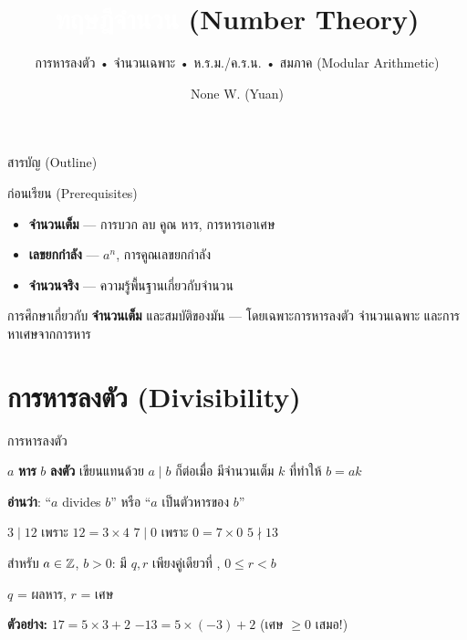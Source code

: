 \documentclass[11pt, aspectratio=169]{beamer}
\title[ทฤษฎีจำนวน]{\textcolor{white}{ทฤษฎีจำนวน} \textcolor{boxBlue!60}{(Number Theory)}}
\subtitle{การหารลงตัว • จำนวนเฉพาะ • ห.ร.ม./ค.ร.น. • สมภาค (Modular Arithmetic) }
\author[None W. (Yuan)]{None W. (Yuan)}
\date{}
\begin{document}
\begin{frame}[plain]\titlepage\end{frame}
\begin{frame}{สารบัญ (Outline)}\tableofcontents\end{frame}

\begin{frame}{ก่อนเรียน (Prerequisites)}
  \begin{explanation}
    \begin{itemize}
      \item \textbf{จำนวนเต็ม} — การบวก ลบ คูณ หาร, การหารเอาเศษ
      \item \textbf{เลขยกกำลัง} — $a^n$, การคูณเลขยกกำลัง
      \item \textbf{จำนวนจริง} — ความรู้พื้นฐานเกี่ยวกับจำนวน
    \end{itemize}
  \end{explanation}

  \begin{intuition}
    การศึกษาเกี่ยวกับ \textbf{จำนวนเต็ม} และสมบัติของมัน —
    โดยเฉพาะการหารลงตัว จำนวนเฉพาะ และการหาเศษจากการหาร
  \end{intuition}
\end{frame}

\section{การหารลงตัว (Divisibility)}

\begin{frame}{การหารลงตัว}
  \begin{explanation}[นิยาม]
    $a$ \textbf{หาร} $b$ \textbf{ลงตัว} เขียนแทนด้วย $a \mid b$
    ก็ต่อเมื่อ มีจำนวนเต็ม $k$ ที่ทำให้ $b = ak$

    \textbf{อ่านว่า}: ``$a$ divides $b$'' หรือ ``$a$ เป็นตัวหารของ $b$''
  \end{explanation}

  \begin{exambox}[ตัวอย่าง]
    $3 \mid 12$ เพราะ $12 = 3 \times 4$ \qquad $7 \mid 0$ เพราะ $0 = 7 \times 0$ \qquad $5 \nmid 13$
  \end{exambox}

  \begin{explanation}
    สำหรับ $a \in \mathbb{Z}$, $b > 0$: มี $q, r$ เพียงคู่เดียวที่ , $0 \leq r < b$

    $q$ = ผลหาร, $r$ = เศษ

    \textbf{ตัวอย่าง:} $17 = 5 \times 3 + 2$ \qquad $-13 = 5 \times (-3) + 2$ \quad (เศษ $\geq 0$ เสมอ!)
  \end{explanation}
\end{frame}
\end{document}
